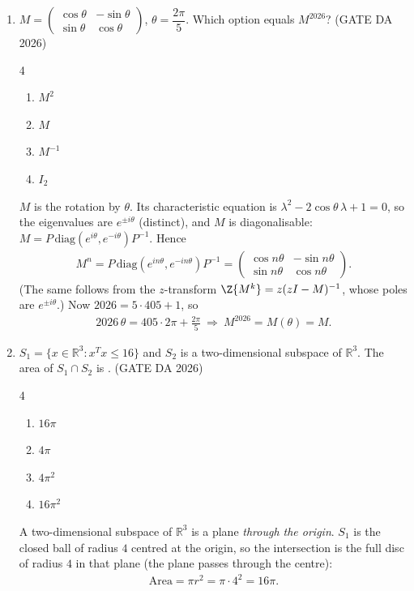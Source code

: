 \begin{enumerate}[label=\textbf{Q.\arabic*},leftmargin=*,start=1]
\item[\textbf{Q.21}] $M=\begin{pmatrix}\cos\theta&-\sin\theta\\ \sin\theta&\cos\theta\end{pmatrix}$,
$\theta=\dfrac{2\pi}{5}$. Which option equals $M^{2026}$?
\hfill (GATE DA 2026)
\begin{multicols}{4}
\begin{enumerate}[label=(\alph*),itemsep=0pt]
 \item $M^2$ \item $M$ \item $M^{-1}$ \item $I_2$
\end{enumerate}
\end{multicols}
\solution
$M$ is the rotation by $\theta$. Its characteristic equation is
$\lambda^2-2\cos\theta\,\lambda+1=0$, so the eigenvalues are $e^{\pm i\theta}$
(distinct), and $M$ is diagonalisable: $M=P\,\mathrm{diag}(e^{i\theta},e^{-i\theta})P^{-1}$.
Hence
\begin{align}
M^{n}=P\,\mathrm{diag}\!\left(e^{in\theta},e^{-in\theta}\right)P^{-1}
=\begin{pmatrix}\cos n\theta&-\sin n\theta\\ \sin n\theta&\cos n\theta\end{pmatrix}.
\end{align}
(The same follows from the $z$-transform $\Z\{M^k\}=z(zI-M)^{-1}$, whose poles are $e^{\pm i\theta}$.)
Now $2026=5\cdot405+1$, so
\begin{align}
2026\,\theta = 405\cdot 2\pi+\frac{2\pi}{5}\ \Rightarrow\ M^{2026}=M(\theta)=M .
\end{align}

\item[\textbf{Q.22}] $S_1=\{x\in\mathbb R^3: x^Tx\le16\}$ and $S_2$ is a
two-dimensional subspace of $\mathbb R^3$. The area of $S_1\cap S_2$ is
\underline{\hspace{1.5cm}}.
\hfill (GATE DA 2026)
\begin{multicols}{4}
\begin{enumerate}[label=(\alph*),itemsep=0pt]
 \item $16\pi$ \item $4\pi$ \item $4\pi^2$ \item $16\pi^2$
\end{enumerate}
\end{multicols}
\solution
A two-dimensional subspace of $\mathbb R^3$ is a plane \emph{through the origin}.
$S_1$ is the closed ball of radius $4$ centred at the origin, so the intersection is the
full disc of radius $4$ in that plane (the plane passes through the centre):
\begin{align}
\text{Area}=\pi r^2=\pi\cdot4^2=\boxed{16\pi}.
\end{align}


\end{enumerate}
